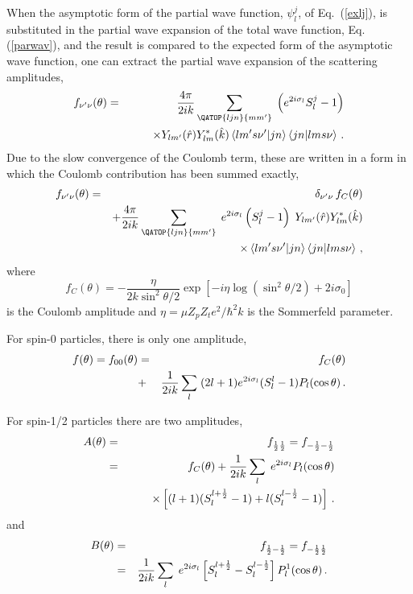 When the asymptotic form of the partial wave function, $\psi_{l}^{j}$, of
Eq.~(\ref{exlj}), is substituted in the partial wave expansion of the total
wave function, Eq. (\ref{parwav}), and the result is compared to the
expected form of the asymptotic wave function, one can extract the partial
wave expansion of the scattering amplitudes, 
\begin{eqnarray}
f_{\nu^{\prime}\nu}(\theta) & = & \frac{4\pi}{2ik}\sum_{{{\QATOP{ljn}{%
mm^{\prime}}}}}\;\left(e^{2i\sigma_{l}}S_{l}^{j}-1\right) \\
& & \qquad\times Y_{lm^{\prime}}(\hat{r})Y_{lm}^{*}(\hat{k})\left\langle
lm^{\prime}s\nu^{\prime}|jn\right\rangle \left\langle jn|lms\nu\right\rangle
\,.  \notag
\end{eqnarray}
Due to the slow convergence of the Coulomb term, these are written in a form
in which the Coulomb contribution has been summed exactly,%
\begin{eqnarray}
f_{\nu^{\prime}\nu}(\theta) & = & \delta_{\nu^{\prime}\nu}\, f_{C}(\theta) \\
& & +\frac{4\pi}{2ik}\sum_{{{\QATOP{ljn}{mm^{\prime}}}}}\;
e^{2i\sigma_{l}}\left(S_{l}^{j}-1\right)\; Y_{lm^{\prime}}(\hat{r}%
)Y_{lm}^{*}(\hat{k})  \notag \\
& & \qquad\qquad\times\left\langle lm^{\prime}s\nu^{\prime}|jn\right\rangle
\left\langle jn|lms\nu\right\rangle \,,  \notag
\end{eqnarray}
where 
\begin{equation}
f_{C}(\theta)=-\frac{\eta}{2k\sin^{2}\theta/2}\exp\left[-i\eta\log\left(%
\sin^{2}\theta/2\right)+2i\sigma_{0}\right]
\end{equation}
is the Coulomb amplitude and $\eta=\mu Z_p Z_t e^2/\hbar^2 k $ is the
Sommerfeld parameter.

For spin-0 particles, there is only one amplitude, 
\begin{eqnarray}
f(\theta)=f_{00}(\theta) & = & f_{C}(\theta) \\
& + & \frac{1}{2ik}\sum_{l}\;(2l+1)e^{2i\sigma_{l}}(S_{l}^{l}-1)P_{l}(\cos%
\theta)\,.  \notag
\end{eqnarray}

For spin-1/2 particles there are two amplitudes, 
\begin{eqnarray}
A(\theta) & = & f_{\frac{1}{2}\frac{1}{2}}=f_{-\frac{1}{2}-\frac{1}{2}} \\
& = & f_{C}(\theta)+\frac{1}{2ik}\sum_{l}\; e^{2i\sigma_{l}}P_{l}(\cos\theta)
\notag \\
& & \qquad\times\left[(l+1)(S_{l}^{l+\frac{1}{2}}-1)+l(S_{l}^{l-\frac{1}{2}%
}-1)\right]\,.  \notag
\end{eqnarray}
and 
\begin{eqnarray}
B(\theta) & = & f_{\frac{1}{2}-\frac{1}{2}}=f_{-\frac{1}{2}\frac{1}{2}} \\
& = & \frac{1}{2ik}\sum_{l}\; e^{2i\sigma_{l}}\left[S_{l}^{l+\frac{1}{2}%
}-S_{l}^{l-\frac{1}{2}}\right]P_{l}^{1}(\cos\theta)\,.  \notag
\end{eqnarray}

